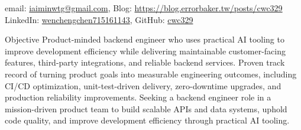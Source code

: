 \documentclass[
	11pt, %
]{resume} %
\begin{document}
%
email: \href{mailto:iaiminwtg@gmail.com}{iaiminwtg@gmail.com}, Blog: \href{https://blog.errorbaker.tw/posts/cwc329}{https://blog.errorbaker.tw/posts/cwc329} \\
LinkedIn: \href{https://www.linkedin.com/in/wenchengchen715161143}{wenchengchen715161143}, GitHub: \href{https://github.com/cwc329}{cwc329}


\begin{rSection}{Objective}
    Product-minded backend engineer who uses practical AI tooling to improve development efficiency while delivering maintainable customer-facing features, third-party integrations, and reliable backend services.
    Proven track record of turning product goals into measurable engineering outcomes, including CI/CD optimization, unit-test-driven delivery, zero-downtime upgrades, and production reliability improvements.
    Seeking a backend engineer role in a mission-driven product team to build scalable APIs and data systems, uphold code quality, and improve development efficiency through practical AI tooling.
\end{rSection}
\end{document}
